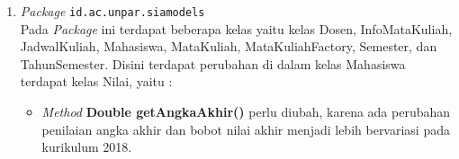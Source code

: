 \begin{enumerate}
	\item \textit{Package} \texttt{id.ac.unpar.siamodels}\\
	Pada \textit{Package} ini terdapat beberapa kelas yaitu kelas Dosen, InfoMataKuliah, JadwalKuliah, Mahasiswa, MataKuliah, MataKuliahFactory, Semester, dan TahunSemester. Disini terdapat perubahan di dalam kelas Mahasiswa terdapat kelas Nilai, yaitu :
	\begin{itemize}
		\item \textit{Method} \textbf{Double getAngkaAkhir()} perlu diubah, karena ada perubahan penilaian angka akhir dan bobot nilai akhir menjadi lebih bervariasi pada kurikulum 2018.
	\end{itemize}
\end{enumerate}